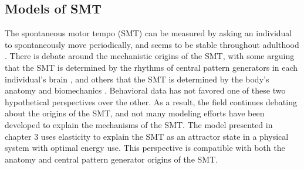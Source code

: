 \documentclass{report}
\begin{document}
\subsection{Models of SMT}
The spontaneous motor tempo (SMT) can be measured by asking an individual to spontaneously move periodically, and seems to be stable throughout adulthood \cite{scheurich2018tapping}. There is debate around the mechanistic origins of the SMT, with some arguing that the SMT is determined by the rhythms of central pattern generators in each individual's brain \cite{latash1992virtual}, and others that the SMT is determined by the body's anatomy and biomechanics \cite{goodman2000advantages}. Behavioral data has not favored one of these two hypothetical perspectives over the other. As a result, the field continues debating about the origins of the SMT, and not many modeling efforts have been developed to explain the mechanisms of the SMT. The model presented in chapter 3 uses elasticity to explain the SMT as an attractor state in a physical system with optimal energy use. This perspective is compatible with both the anatomy and central pattern generator origins of the SMT. 
\end{document}
